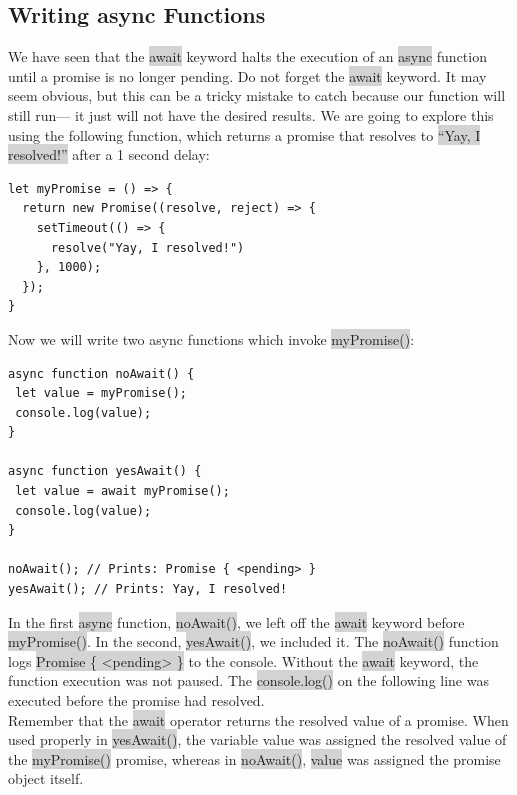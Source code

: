 \documentclass[11pt]{article}
\begin{document}
\subsection{Writing async Functions} 
We have seen that the \colorbox{lightgray}{await} keyword halts the execution of an \colorbox{lightgray}{async} function until a promise is no longer pending. Do not forget the \colorbox{lightgray}{await} keyword. It may seem obvious, but this can be a tricky mistake to catch because our function will still run— it just will not have the desired results. We are going to explore this using the following function, which returns a promise that resolves to \colorbox{lightgray}{``Yay, I resolved!''} after a 1 second delay:
\begin{lstlisting}
let myPromise = () => {
  return new Promise((resolve, reject) => {
    setTimeout(() => {
      resolve("Yay, I resolved!")
    }, 1000);
  });
}
\end{lstlisting}
Now we will write two async functions which invoke \colorbox{lightgray}{myPromise()}:
\begin{lstlisting}
async function noAwait() {
 let value = myPromise();
 console.log(value);
}

async function yesAwait() {
 let value = await myPromise();
 console.log(value);
}

noAwait(); // Prints: Promise { <pending> }
yesAwait(); // Prints: Yay, I resolved!
\end{lstlisting}
In the first \colorbox{lightgray}{async} function, \colorbox{lightgray}{noAwait()}, we left off the \colorbox{lightgray}{await} keyword before \colorbox{lightgray}{myPromise()}. In the second, \colorbox{lightgray}{yesAwait()}, we included it. The \colorbox{lightgray}{noAwait()} function logs \colorbox{lightgray}{Promise \{ <pending> \}} to the console. Without the \colorbox{lightgray}{await} keyword, the function execution was not paused. The \colorbox{lightgray}{console.log()} on the following line was executed before the promise had resolved. \\
\newline
Remember that the \colorbox{lightgray}{await} operator returns the resolved value of a promise. When used properly in \colorbox{lightgray}{yesAwait()}, the variable value was assigned the resolved value of the \colorbox{lightgray}{myPromise()} promise, whereas in \colorbox{lightgray}{noAwait()}, \colorbox{lightgray}{value} was assigned the promise object itself.
\end{document}
